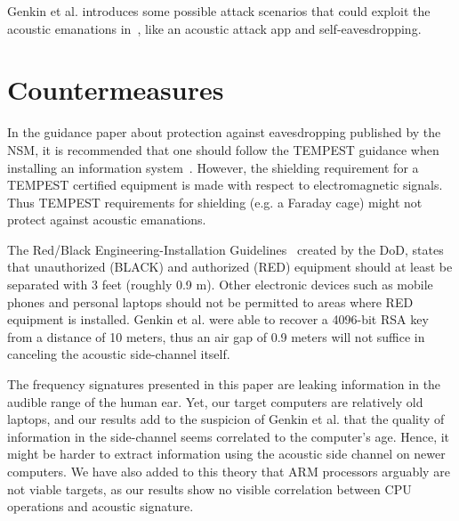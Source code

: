 Genkin et al. introduces some possible attack scenarios that could exploit the acoustic emanations in~\cite[Section 1.2 and Appendix B]{DBLP:journals/iacr/GenkinST13}, like an acoustic attack app and self-eavesdropping.

\section{Countermeasures}\label{chp6:sec:countermeasures}

In the guidance paper about protection against eavesdropping published by the \gls{NSM}, it is recommended that one should follow the TEMPEST guidance when installing an information system~\cite[Section 9.8, page 7]{url:NSM/avlytting}.
However, the shielding requirement for a TEMPEST certified equipment is made with respect to electromagnetic signals.
Thus TEMPEST requirements for shielding (e.g. a Faraday cage) might not protect against acoustic emanations. 

The Red/Black Engineering-Installation Guidelines~\cite[Section 30.1, page 91]{url:Red/Black/Engineering} created by the \gls{DoD}, states that unauthorized (BLACK) and authorized (RED) equipment should at least be separated with 3 feet (roughly 0.9 m).
Other electronic devices such as mobile phones and personal laptops should not be permitted to areas where RED equipment is installed. 
Genkin et al. were able to recover a 4096-bit RSA key from a distance of 10 meters, thus an air gap of 0.9 meters will not suffice in canceling the acoustic side-channel itself.

The frequency signatures presented in this paper are leaking information in the audible range of the human ear.
Yet, our target computers are relatively old laptops, and our results add to the suspicion of Genkin et al. that the quality of information in the side-channel seems correlated to the computer's age.
Hence, it might be harder to extract information using the acoustic side channel on newer computers.
We have also added to this theory that ARM processors arguably are not viable targets, as our results show no visible correlation between CPU operations and acoustic signature.
